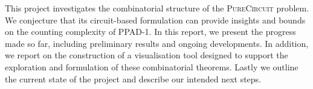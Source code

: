 This project investigates the combinatorial structure of the \textsc{PureCircuit} problem.
We conjecture that its circuit-based formulation can provide insights and bounds on the counting complexity of \textsc{PPAD-1}.
In this report, we present the progress made so far, including preliminary results and ongoing developments.
In addition, we report on the construction of a visualisation tool designed to support the exploration and formulation of these combinatorial theorems.
Lastly we outline the current state of the project and describe our intended next steps.
